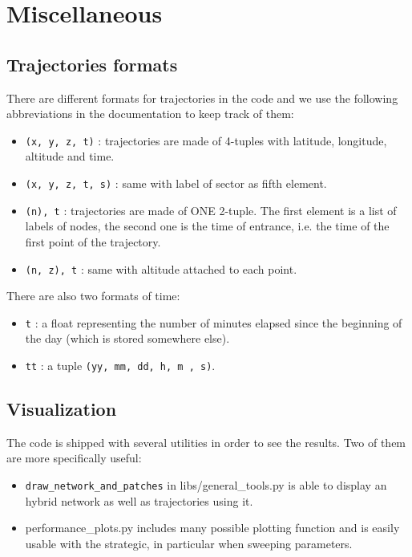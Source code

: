 \documentclass[12pt]{article}
\begin{document}
\section{Miscellaneous}

\subsection{Trajectories formats}

There are different formats for trajectories in the code and we use the following abbreviations in the documentation to keep track of them:
\begin{itemize}
\item  \verb|(x, y, z, t)| : trajectories are made of 4-tuples with latitude, longitude, altitude and 
time.
\item \verb|(x, y, z, t, s)| : same with label of sector as fifth element.
\item \verb|(n), t| : trajectories are made of ONE 2-tuple. The first element is a list of labels
of nodes, the second one is the time of entrance, i.e. the time of the first point of the trajectory.
\item \verb|(n, z), t| : same with altitude attached to each point.
\end{itemize}
There are also two formats of time:
\begin{itemize}
\item \verb|t| : a float representing the number of minutes elapsed since the beginning of 
the day (which is stored somewhere else).
\item \verb|tt| : a tuple \verb|(yy, mm, dd, h, m , s)|.
\end{itemize}

\subsection{Visualization}

The code is shipped with several utilities in order to see the results. Two of them are more specifically useful:
\begin{itemize}
\item \verb|draw_network_and_patches| in libs/general\_tools.py is able to display an hybrid network as well as trajectories using it.
\item performance\_plots.py includes many possible plotting function and is easily usable with the strategic, in particular when sweeping parameters. 
\end{itemize}
\end{document}
